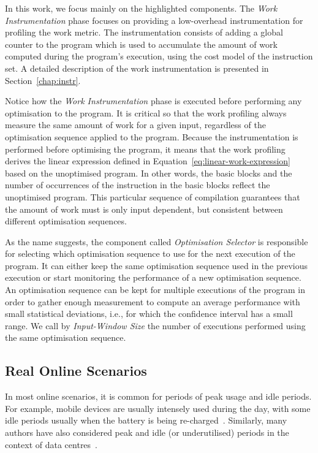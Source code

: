 \documentclass[sigplan,10pt]{acmart}
\theoremstyle{definition}
\begin{document}
In this work, we focus mainly on the highlighted components.
The \textit{Work Instrumentation} phase focuses on providing a low-overhead instrumentation for profiling the work metric.
The instrumentation consists of adding a global counter to the program which is used to accumulate the amount of work computed during the program's execution, using the cost model of the instruction set.
A detailed description of the work instrumentation is presented in Section~\ref{chap:instr}.

Notice how the \textit{Work Instrumentation} phase is executed before performing any optimisation to the program.
It is critical so that the work profiling always measure the same amount of work for a given input, regardless of the optimisation sequence applied to the program.
Because the instrumentation is performed before optimising the program, it means that the work profiling derives the linear expression defined in Equation~\ref{eq:linear-work-expression}
based on the unoptimised program.
In other words, the basic blocks and the number of occurrences of the instruction in the basic blocks reflect the unoptimised program.
This particular sequence of compilation guarantees that the amount of work must is only input dependent, but consistent between different optimisation sequences.

As the name suggests, the component called \textit{Optimisation Selector} is responsible for selecting which optimisation sequence to use for the next execution of the program.
It can either keep the same optimisation sequence used in the previous execution or start monitoring the performance of a new optimisation sequence.
An optimisation sequence can be kept for multiple executions of the program in order to gather enough measurement to compute an average performance with small statistical deviations, i.e., for which the confidence interval has a small range.
We call by \textit{Input-Window Size} the number of executions performed using the same optimisation sequence.

\subsection{Real Online Scenarios}

In most online scenarios, it is common for periods of peak usage and idle periods.
For example, mobile devices are usually intensely used during the day, with some idle periods usually when the battery is being re-charged~\citep{mpeis16}.
Similarly, many authors have also considered peak and idle (or underutilised) periods in the context of data centres~\citep{armbrust10,chen12b}.
\end{document}
